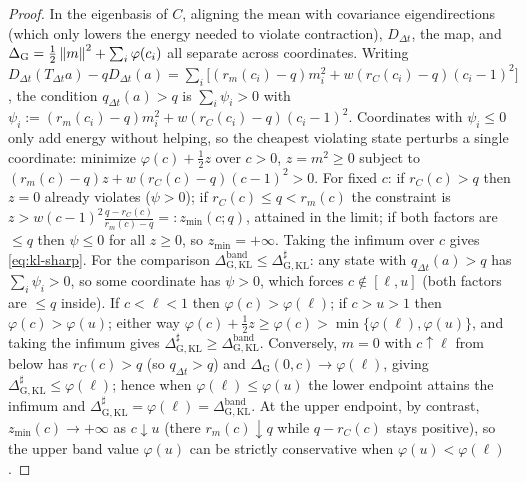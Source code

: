 \begin{proof}
In the eigenbasis of $C$, aligning the mean with covariance eigendirections (which only
lowers the energy needed to violate contraction), $D_{\Delta t}$, the map, and
$\Delta_{\mathrm G}=\tfrac12\left\lVert m\right\rVert^2+\sum_i\varphi(c_i)$ all separate across coordinates.
Writing $D_{\Delta t}(T_{\Delta t}a)-qD_{\Delta t}(a)=\sum_i\bigl[(r_m(c_i)-q)m_i^2+w(r_C(c_i)-q)(c_i-1)^2\bigr]$,
the condition $q_{\Delta t}(a)>q$ is $\sum_i\psi_i>0$ with $\psi_i:=(r_m(c_i)-q)m_i^2+w(r_C(c_i)-q)(c_i-1)^2$.
Coordinates with $\psi_i\leq0$ only add energy without helping, so the cheapest violating
state perturbs a single coordinate: minimize $\varphi(c)+\tfrac12z$ over $c>0$, $z=m^2\geq0$
subject to $(r_m(c)-q)z+w(r_C(c)-q)(c-1)^2>0$. For fixed $c$: if $r_C(c)>q$ then $z=0$
already violates ($\psi>0$); if $r_C(c)\leq q<r_m(c)$ the constraint is
$z>w(c-1)^2\frac{q-r_C(c)}{r_m(c)-q}=:z_{\min}(c;q)$, attained in the limit; if both factors
are $\leq q$ then $\psi\leq0$ for all $z\geq0$, so $z_{\min}=+\infty$. Taking the infimum
over $c$ gives \eqref{eq:kl-sharp}. For the comparison
$\Delta_{\mathrm{G,KL}}^{\mathrm{band}}\leq\Delta_{\mathrm{G,KL}}^\sharp$: any state with
$q_{\Delta t}(a)>q$ has $\sum_i\psi_i>0$, so some coordinate has $\psi>0$, which forces
$c\notin[\ell,u]$ (both factors are $\leq q$ inside). If $c<\ell<1$ then
$\varphi(c)>\varphi(\ell)$; if $c>u>1$ then $\varphi(c)>\varphi(u)$; either way
$\varphi(c)+\tfrac12z\geq\varphi(c)>\min\{\varphi(\ell),\varphi(u)\}$, and taking the infimum
gives $\Delta_{\mathrm{G,KL}}^\sharp\geq\Delta_{\mathrm{G,KL}}^{\mathrm{band}}$. Conversely,
$m=0$ with $c\uparrow\ell$ from below has $r_C(c)>q$ (so $q_{\Delta t}>q$) and
$\Delta_{\mathrm G}(0,c)\to\varphi(\ell)$, giving $\Delta_{\mathrm{G,KL}}^\sharp\leq\varphi(\ell)$;
hence when $\varphi(\ell)\leq\varphi(u)$ the lower endpoint attains the infimum and
$\Delta_{\mathrm{G,KL}}^\sharp=\varphi(\ell)=\Delta_{\mathrm{G,KL}}^{\mathrm{band}}$. At the
upper endpoint, by contrast, $z_{\min}(c)\to+\infty$ as $c\downarrow u$ (there
$r_m(c)\downarrow q$ while $q-r_C(c)$ stays positive), so the upper band value $\varphi(u)$
can be strictly conservative when $\varphi(u)<\varphi(\ell)$.
\end{proof}

